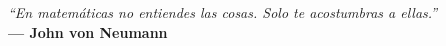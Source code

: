 \begin{dedication}
   



\vspace*{\fill}

%    
%    
\textit{``En matemáticas no entiendes las cosas. Solo te acostumbras a ellas.''} \\
\textbf{--- John von Neumann}

\vspace*{\fill}

\end{dedication}